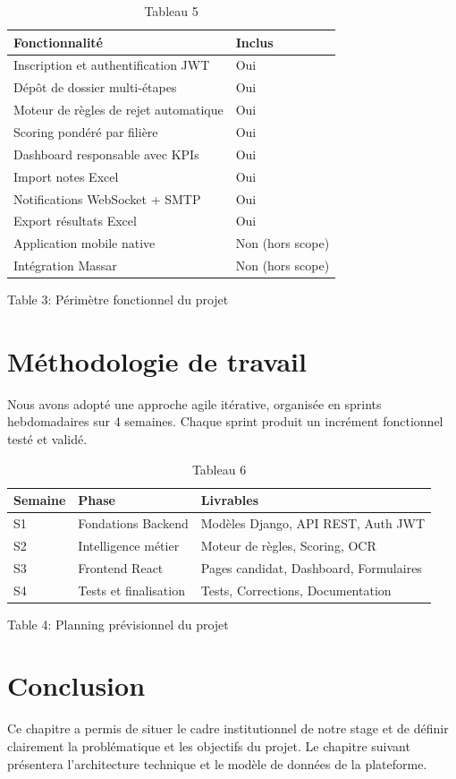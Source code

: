 \begin{table}[htbp]
\centering
\begin{tabular}{|l|l|}
\hline
Fonctionnalité & Inclus \\
\hline
Inscription et authentification JWT & Oui \\
\hline
Dépôt de dossier multi-étapes & Oui \\
\hline
Moteur de règles de rejet automatique & Oui \\
\hline
Scoring pondéré par filière & Oui \\
\hline
Dashboard responsable avec KPIs & Oui \\
\hline
Import notes Excel & Oui \\
\hline
Notifications WebSocket + SMTP & Oui \\
\hline
Export résultats Excel & Oui \\
\hline
Application mobile native & Non (hors scope) \\
\hline
Intégration Massar & Non (hors scope) \\
\hline
\end{tabular}
\caption{Tableau 5}
\label{tab:table_5}
\end{table}

Table 3:  Périmètre fonctionnel du projet

\section{Méthodologie de travail}

Nous avons adopté une approche agile itérative, organisée en sprints hebdomadaires sur 4 semaines. Chaque sprint produit un incrément fonctionnel testé et validé.

\begin{table}[htbp]
\centering
\begin{tabular}{|l|l|l|}
\hline
Semaine & Phase & Livrables \\
\hline
S1 & Fondations Backend & Modèles Django, API REST, Auth JWT \\
\hline
S2 & Intelligence métier & Moteur de règles, Scoring, OCR \\
\hline
S3 & Frontend React & Pages candidat, Dashboard, Formulaires \\
\hline
S4 & Tests et finalisation & Tests, Corrections, Documentation \\
\hline
\end{tabular}
\caption{Tableau 6}
\label{tab:table_6}
\end{table}

Table 4: Planning prévisionnel du projet

\section{Conclusion}

Ce chapitre a permis de situer le cadre institutionnel de notre stage et de définir clairement la problématique et les objectifs du projet. Le chapitre suivant présentera l'architecture technique et le modèle de données de la plateforme.

